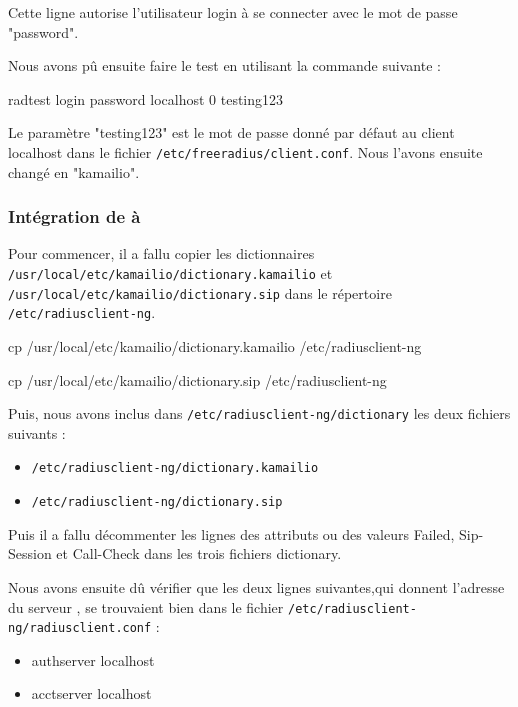 Cette ligne autorise l'utilisateur login à se connecter avec le mot de passe "password".

Nous avons pû ensuite faire le test en utilisant la commande suivante :

\begin{shellcode}
radtest login password localhost 0 testing123
\end{shellcode}

Le paramètre "testing123" est le mot de passe donné par défaut au client localhost dans le fichier \texttt{/etc/freeradius/client.conf}. Nous l'avons ensuite changé en "kamailio".


\subsubsection{Intégration de {\rad} à {\kam}}

Pour commencer, il a fallu copier les dictionnaires \texttt{/usr/local/etc/kamailio/dictionary.kamailio} et \texttt{/usr/local/etc/kamailio/dictionary.sip} dans le répertoire \texttt{/etc/radiusclient-ng}.

\begin{shellcode}
cp /usr/local/etc/kamailio/dictionary.kamailio /etc/radiusclient-ng

cp /usr/local/etc/kamailio/dictionary.sip /etc/radiusclient-ng
\end{shellcode}

Puis, nous avons inclus dans \texttt{/etc/radiusclient-ng/dictionary} les deux fichiers suivants :

\begin{itemize}
\item{\texttt{/etc/radiusclient-ng/dictionary.kamailio}}
\item{\texttt{/etc/radiusclient-ng/dictionary.sip}}
\end{itemize}

Puis il a fallu décommenter les lignes des attributs ou des valeurs Failed, Sip-Session et Call-Check dans les trois fichiers dictionary.

Nous avons ensuite dû vérifier que les deux lignes suivantes,qui donnent l'adresse du serveur {\rad}, se trouvaient bien dans le fichier \texttt{/etc/radiusclient-ng/radiusclient.conf} :

\begin{itemize}
\item{authserver localhost}
\item{acctserver localhost}
\end{itemize}

